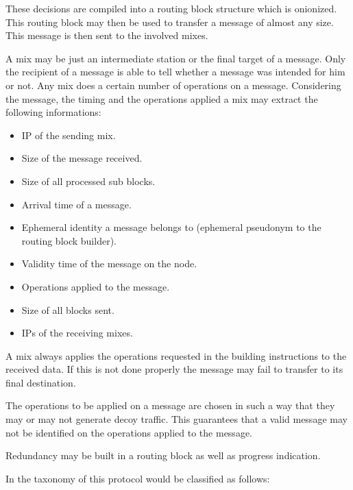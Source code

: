 These decisions are compiled into a routing block structure which is onionized. This routing block may then be used to transfer a message of almost any size. This message is then sent to the involved mixes.

A mix may be just an intermediate station or the final target of a message. Only the recipient of a message is able to tell whether a message was intended for him or not. Any mix does a certain number of operations on a message. Considering the message, the timing and the operations applied a mix may extract the following informations:

\begin{itemize}
	\item IP of the sending mix.
	\item Size of the message received.
	\item Size of all processed sub blocks.
	\item Arrival time of a message.
	\item Ephemeral identity a message belongs to (ephemeral pseudonym to the routing block builder).
	\item Validity time of the message on the node.
	\item Operations applied to the message.
	\item Size of all blocks sent.
	\item IPs of the receiving mixes.
\end{itemize}

A mix always applies the operations requested in the building instructions to the received data. If this is not done properly the message may fail to transfer to its final destination. 

The operations to be applied on a message are chosen in such a way that they may or may not generate decoy traffic. This guarantees that a valid message may not be identified on the operations applied to the message.

Redundancy may be built in a routing block as well as progress indication.

In the taxonomy of \cite{Shirazi2018} this protocol would be classified as follows:

